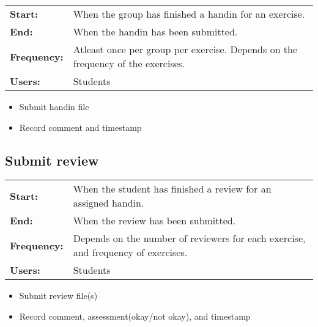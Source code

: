 \documentclass[Main]{subfiles}
\begin{document}
\begin{longtable}{l p{13cm}}
 \textbf{Start:} & When the group has finished a handin for an exercise. \\
 \textbf{End:} & When the handin has been submitted.  \\
 \textbf{Frequency:} & Atleast once per group per exercise. Depends on the frequency of the exercises. \\
 \textbf{Users:} & Students \\
\end{longtable}

\begin{itemize}
\item Submit handin file
\item Record comment and timestamp
\end{itemize}

\subsection{Submit review}

\begin{longtable}{l p{13cm}}
 \textbf{Start:} & When the student has finished a review for an assigned handin. \\
 \textbf{End:} & When the review has been submitted.  \\
 \textbf{Frequency:} & Depends on the number of reviewers for each exercise, and frequency of exercises. \\
 \textbf{Users:} & Students \\
\end{longtable}

\begin{itemize}
\item Submit review file(s)
\item Record comment, assessment(okay/not okay), and timestamp
\end{itemize}
\end{document}
